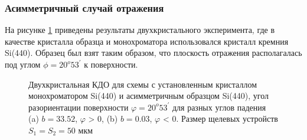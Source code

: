   \subsubsection{Асимметричный случай отражения}
  На рисунке \ref{ris:assymetric_exp_50}
  приведены результаты двухкристального эксперимента, где в качестве
  кристалла образца и монохроматора использовался кристалл кремния Si(440). Образец был взят таким
  образом, что плоскость отражения располагалась под углом $\phi = 20^o 53^{'}$ к поверхности.

  \begin{figure}[H]
    \centering
    \hfill
    \caption{Двухкристальная КДО для схемы с установленным кристаллом монохроматором Si(440) и асимметричным образцом Si(440),
    угол разориентации поверхности $\varphi = 20^o53^{'}$ для разных углов падения (a) $b = 33.52$, $\varphi$ > 0, (b) $b = 0.03$, $\varphi$ < 0.
     Размер щелевых устройств $S_1 = S_2 = 50$ мкм}
    \label{ris:assymetric_exp_50}
  \end{figure}

